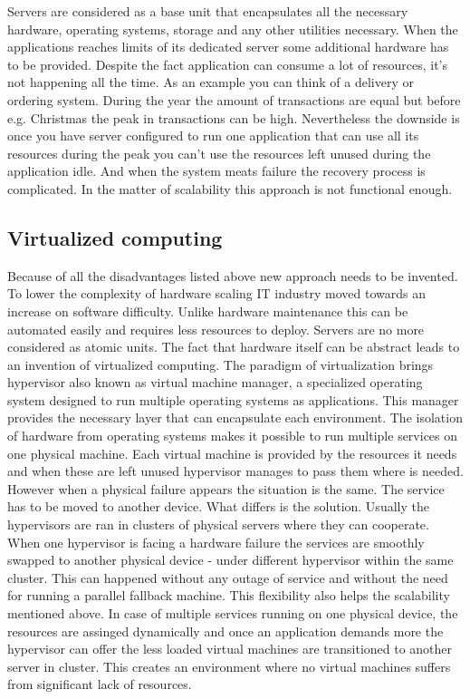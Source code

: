 Servers are considered as a base unit that encapsulates all the necessary hardware, operating systems, storage and any other utilities necessary. When the applications reaches limits of its dedicated server some additional hardware has to be provided. Despite the fact application can consume a lot of resources, it's not happening all the time. As an example you can think of a delivery or ordering system. During the year the amount of transactions are equal but before e.g. Christmas the peak in transactions can be high. Nevertheless the downside is once you have server configured to run one application that can use all its resources during the peak you can't use the resources left unused during the application idle. And when the system meats failure the recovery process is complicated. In the matter of scalability this approach is not functional enough.

\subsection{Virtualized computing}
\label{sub:Virtualized computing}

Because of all the disadvantages listed above new approach needs to be invented. To lower the complexity of hardware scaling IT industry moved towards an increase on software difficulty. Unlike hardware maintenance this can be automated easily and requires less resources to deploy. Servers are no more considered as atomic units. The fact that hardware itself can be abstract leads to an invention of virtualized computing. The paradigm of virtualization brings hypervisor also known as virtual machine manager, a specialized operating system designed to run multiple operating systems as applications. This manager provides the necessary layer that can encapsulate each environment. The isolation of hardware from operating systems makes it possible to run multiple services on one physical machine. Each virtual machine is provided by the resources it needs and when these are left unused hypervisor manages to pass them where is needed.
However when a physical failure appears the situation is the same. The service has to be moved to another device. What differs is the solution. Usually the hypervisors are ran in clusters of physical servers where they can cooperate. When one hypervisor is facing a hardware failure the services are smoothly swapped to another physical device - under different hypervisor within the same cluster. This can happened without any outage of service and without the need for running a parallel fallback machine. This flexibility also helps the scalability mentioned above. In case of multiple services running on one physical device, the resources are assinged dynamically and once an application demands more the hypervisor can offer the less loaded virtual machines are transitioned to another server in cluster. This creates an environment where no virtual machines suffers from significant lack of resources.

